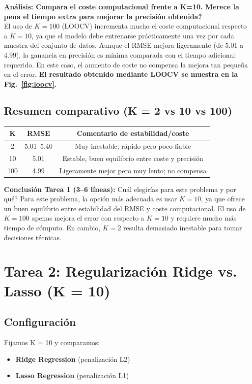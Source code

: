 \noindent\textbf{Análisis: Compara el coste computacional frente a K=10. \textquestiondown Merece la pena el tiempo extra para mejorar la precisión obtenida?}\\
El uso de $K = 100$ (LOOCV) incrementa mucho el coste computacional respecto a $K = 10$, ya que el modelo debe entrenarse prácticamente una vez por cada muestra del conjunto de datos. Aunque el RMSE mejora ligeramente (de 5.01 a 4.99), la ganancia en precisión es mínima comparada con el tiempo adicional requerido. En este caso, el aumento de coste no compensa la mejora tan pequeña en el error.
\textbf{El resultado obtenido mediante LOOCV se muestra en la Fig.~\ref{fig:loocv}.}

\subsection{Resumen comparativo (K = 2 vs 10 vs 100)}

\begin{center}
\begin{tabular}{|c|c|c|}
\hline
K & RMSE & Comentario de estabilidad/coste \\
\hline
2 & 5.01--5.40 & Muy inestable; rápido pero poco fiable \\
10 & 5.01 & Estable, buen equilibrio entre coste y precisión \\
100 & 4.99 & Ligeramente mejor pero muy lento; no compensa \\
\hline
\end{tabular}
\end{center}

\noindent\textbf{Conclusión Tarea 1 (3--6 líneas):}
\textquestiondown Cuál elegirías para este problema y por qué?
Para este problema, la opción más adecuada es usar $K = 10$, ya que ofrece un buen equilibrio entre estabilidad del RMSE y coste computacional. El uso de $K=100$ apenas mejora el error con respecto a $K = 10$ y requiere mucho más tiempo de cómputo. En cambio, $K = 2$ resulta demasiado inestable para tomar decisiones técnicas. 

\section{Tarea 2: Regularización Ridge vs. Lasso (K = 10)}
\subsection{Configuración}
Fijamos K = 10 y comparamos:
\begin{itemize}
    \item \textbf{Ridge Regression} (penalización L2)
    \item \textbf{Lasso Regression} (penalización L1)
\end{itemize}

